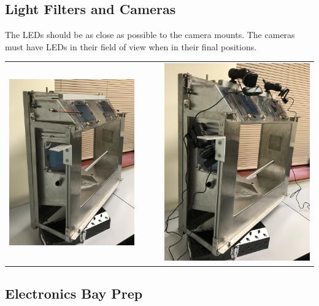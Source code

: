 %
%
\clearpage
\subsection{Light Filters and Cameras}
\label{sect-setup-howto-lightfilt}

The LEDs should be as close as possible to the camera mounts. The cameras
must have LEDs in their field of view when in their final positions.

\begin{tabular}{ccc}
\includegraphics[height=0.55\columnwidth]
{photos/install-20181106/lightfilts.jpg} &
~~~ &
\includegraphics[height=0.55\columnwidth]
{photos/install-20181106/cameras.jpg} \\
\end{tabular}

%
%
\clearpage
\subsection{Electronics Bay Prep}
\label{sect-setup-howto-bay}

